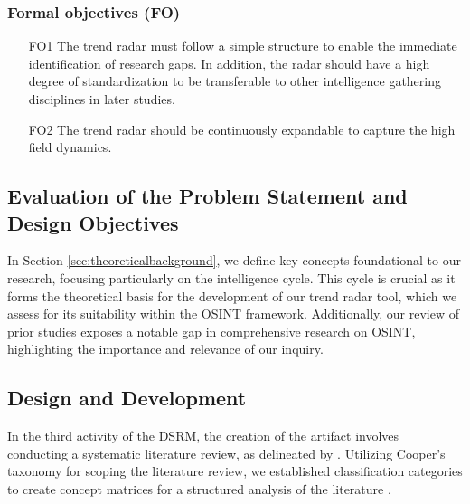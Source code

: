 \documentclass[10pt]{article}
\begin{document}
\subsubsection*{Formal objectives (FO)}

\begin{itemize}
    \item[FO1] The trend radar must follow a simple structure to enable the immediate identification of research gaps. In addition, the radar should have a high degree of standardization to be transferable to other intelligence gathering disciplines in later studies.
    \item[FO2] The trend radar should be continuously expandable to capture the high field dynamics.
\end{itemize}


\subsection{Evaluation of the Problem Statement and Design Objectives}

In Section \ref{sec:theoreticalbackground}, we define key concepts foundational to our research, focusing particularly on the intelligence cycle. This cycle is crucial as it forms the theoretical basis for the development of our trend radar tool, which we assess for its suitability within the OSINT framework. Additionally, our review of prior studies exposes a notable gap in comprehensive research on OSINT, highlighting the importance and relevance of our inquiry.


\subsection{Design and Development}
In the third activity of the DSRM, the creation of the artifact involves conducting a systematic literature review, as delineated by \cite{Cleven.2009}. Utilizing Cooper's taxonomy \cite{Cooper.1988} for scoping the literature review, we established classification categories to create concept matrices for a structured analysis of the literature \cite{Webster.2002}.
\end{document}
